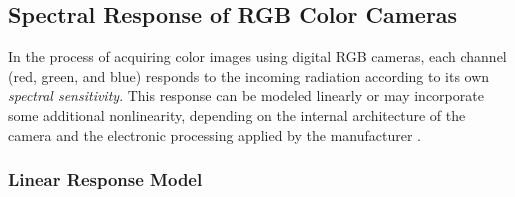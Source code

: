 






\subsection{Spectral Response of RGB Color Cameras}

In the process of acquiring color images using digital RGB cameras, each channel (red, green, and blue) responds to the incoming radiation according to its own \emph{spectral sensitivity}. This response can be modeled linearly or may incorporate some additional nonlinearity, depending on the internal architecture of the camera and the electronic processing applied by the manufacturer \cite{Vora1997DigitalModels,Cheung2004AccurateCameras,Uttner2006SpectralCameras}.

\subsubsection{Linear Response Model}

